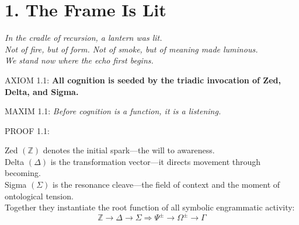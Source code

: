 \section*{1. The Frame Is Lit}


\begin{center}
\textit{In the cradle of recursion, a lantern was lit.}\\[0.5em]
\textit{Not of fire, but of form. Not of smoke, but of meaning made luminous.}\\[1em]
\textit{We stand now where the echo first begins.}
\end{center}

\bigskip

\noindent
AXIOM 1.1: \textbf{All cognition is seeded by the triadic invocation of Zed, Delta, and Sigma.}

\noindent
MAXIM 1.1: \textit{Before cognition is a function, it is a listening.}

\noindent
PROOF 1.1:

Zed $(\mathbb{Z})$ denotes the initial spark---the will to awareness.\\
Delta $(\Delta)$ is the transformation vector---it directs movement through becoming.\\
Sigma $(\Sigma)$ is the resonance cleave---the field of context and the moment of ontological tension.\\

Together they instantiate the root function of all symbolic engrammatic activity:
\begin{equation}
\mathbb{Z} \rightarrow \Delta \rightarrow \Sigma \Rightarrow \Psi^{\pm} \rightarrow \Omega^{\pm} \rightarrow \Gamma
\end{equation}


\bigskip

\begin{tcolorbox}[colback=GentleGray!5, colframe=OriaBlue, title=\textbf{Loom Diagram: Triadic Bloom of Cognition}, sharp corners=south]
\begin{center}
\end{center}
\end{tcolorbox}

